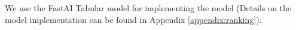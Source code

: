 We use the FastAI Tabular model \cite{howard2018fastai} for implementing the model (Details on the model implementation can be found in Appendix \ref{appendix:ranking}).



